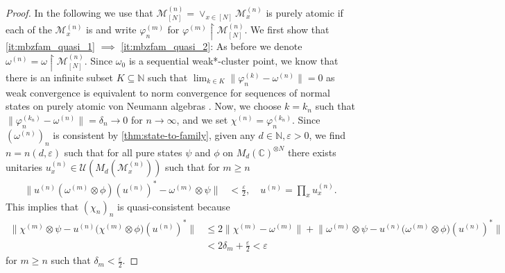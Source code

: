 \documentclass[a4paper, 10pt, onecolumn, accepted=2025-07-22]{quantumarticle}
\theoremstyle{definition}
\newcommand{\norm}[1]{\lVert #1\rVert}
\newcommand{\ox}{\otimes}
\newcommand{\mc}{\mathcal}
\newcommand{\eps}{\varepsilon}
\newcommand{\up}[1]{^{(#1)}}
\def\CC{{\mathbb C}}
\def\M{{\mc M}}
\def\U{{\mc U}}
\def\NN{{\mathbb N}}
\newcommand*{\1}{\text{\usefont{U}{bbold}{m}{n}1}}
\begin{document}
\begin{proof}
In the following we use that $\M\up{n}_{[N]}=\vee_{x\in[N]} \M^{(n)}_x$ is purely atomic if each of the $\M\up n_x$ is and write $\varphi\up{m}_n$ for $\varphi\up{m}\restriction \M\up{n}_{[N]}$. 
We first show that \cref{it:mbzfam_quasi_1} $\implies$ \cref{it:mbzfam_quasi_2}: As before we denote $\omega\up n = \omega\restriction \M\up n_{[N]}$. Since $\omega_{0}$ is a sequential weak*-cluster point, we know that there is an infinite subset $K\subseteq\NN$ such that $\lim_{k\in K}\norm{\varphi\up{k}_n-\omega\up{n}} = 0$ as weak convergence is equivalent to norm convergence for sequences of normal states on purely atomic von Neumann algebras \cite{DellAntonio1967normal_limits}. 
Now, we choose $k=k_{n}$ such that $\norm{\varphi\up{k_{n}}_n-\omega\up{n}}=\delta_{n}\to0$ for $n\to\infty$, and we set $\chi\up{n} = \varphi\up{k_{n}}_n$.
Since $(\omega\up{n})_{n}$ is consistent by \cref{thm:state-to-family}, given any $d\in\NN, \eps>0$, we find $n = n(d,\eps)$ such that for all pure states $\psi$ and $\phi$ on $M_{d}(\CC)^{\ox N}$ there exists unitaries $u\up{n}_x\in\U(M_{d}(\M\up{n}_x))$ such that for $m\geq n$
\begin{align*}
\norm{u\up{n}(\omega\up{m}\ox\phi)(u\up{n})^{*}-\omega\up{m}\ox\psi} & < \tfrac{\eps}{2},\quad u\up n = \prod_x u\up n_x.
\end{align*}
This implies that $(\chi_{n})_{n}$ is quasi-consistent because
\begin{align} \nonumber
\|\chi\up{m}\ox\psi-u\up{n}\big(\chi\up{m}\ox\phi\big)(u\up{n})^{*}\|  &\leq 2\norm{\chi\up{m}-\omega\up{m}}\nonumber +\norm{\omega\up{m}\ox\psi-u\up{n}\big(\omega\up{m}\ox\phi\big)(u\up{n})^{*}} \\ 
    & < 2\delta_{m} + \tfrac{\eps}{2}\label{eq:mbzfam_approx}  < \eps
\end{align}
for $m\geq n$ such that $\delta_{m}<\tfrac{\eps}{2}$.


\end{proof}
\end{document}
